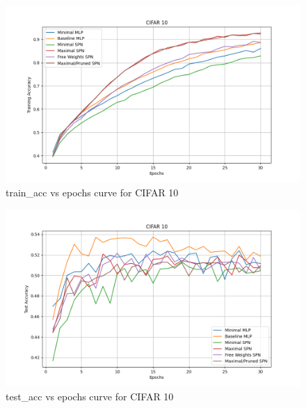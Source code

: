 \begin{figure}[H]
    \centering
    \includegraphics[width=\linewidth]{Figures/Results/CIFAR_10/training_accuracy_plot.png} %
    \captionsetup{width=\linewidth}
    \caption{train\_acc vs epochs curve for CIFAR 10}
    \label{fig:cifarTrainCurve}
\end{figure}

\begin{figure}[H]
    \centering
    \includegraphics[width=\linewidth]{Figures/Results/CIFAR_10/test_accuracy_plot.png} %
    \captionsetup{width=\linewidth}
    \caption{test\_acc vs epochs curve for CIFAR 10}
    \label{fig:cifarTestCurve}
\end{figure}

